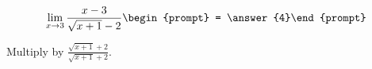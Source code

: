 \documentclass{ximera}
\author{Bart Snapp}
\begin{document}
\begin{exercise}

\[
\lim_{x\to 3 } \frac{x-3}{\sqrt{x+1}-2}\begin{prompt} = \answer{4}\end{prompt}
\]
\begin{hint}
Multiply by $\frac{\sqrt{x+1}+2}{\sqrt{x+1}+2}$.
\end{hint}
\end{exercise}
\end{document}
